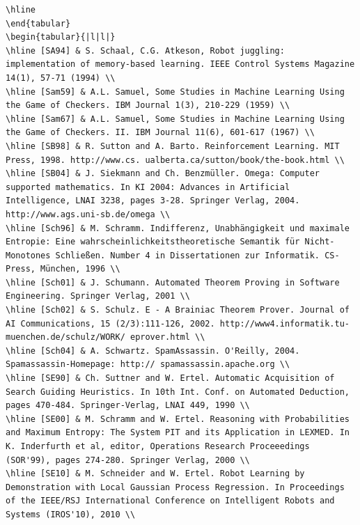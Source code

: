 \documentclass[10pt]{book}
\begin{document}
\begin{center}
\begin{enumerate}
\begin{center}
\begin{center}
\begin{center}
\begin{center}
\begin{center}
\begin{verbatim}
\hline
\end{tabular}
\begin{tabular}{|l|l|}
\hline [SA94] & S. Schaal, C.G. Atkeson, Robot juggling: implementation of memory-based learning. IEEE Control Systems Magazine 14(1), 57-71 (1994) \\
\hline [Sam59] & A.L. Samuel, Some Studies in Machine Learning Using the Game of Checkers. IBM Journal 1(3), 210-229 (1959) \\
\hline [Sam67] & A.L. Samuel, Some Studies in Machine Learning Using the Game of Checkers. II. IBM Journal 11(6), 601-617 (1967) \\
\hline [SB98] & R. Sutton and A. Barto. Reinforcement Learning. MIT Press, 1998. http://www.cs. ualberta.ca/sutton/book/the-book.html \\
\hline [SB04] & J. Siekmann and Ch. Benzmüller. Omega: Computer supported mathematics. In KI 2004: Advances in Artificial Intelligence, LNAI 3238, pages 3-28. Springer Verlag, 2004. http://www.ags.uni-sb.de/omega \\
\hline [Sch96] & M. Schramm. Indifferenz, Unabhängigkeit und maximale Entropie: Eine wahrscheinlichkeitstheoretische Semantik für Nicht-Monotones Schließen. Number 4 in Dissertationen zur Informatik. CS-Press, München, 1996 \\
\hline [Sch01] & J. Schumann. Automated Theorem Proving in Software Engineering. Springer Verlag, 2001 \\
\hline [Sch02] & S. Schulz. E - A Brainiac Theorem Prover. Journal of AI Communications, 15 (2/3):111-126, 2002. http://www4.informatik.tu-muenchen.de/schulz/WORK/ eprover.html \\
\hline [Sch04] & A. Schwartz. SpamAssassin. O'Reilly, 2004. Spamassassin-Homepage: http:// spamassassin.apache.org \\
\hline [SE90] & Ch. Suttner and W. Ertel. Automatic Acquisition of Search Guiding Heuristics. In 10th Int. Conf. on Automated Deduction, pages 470-484. Springer-Verlag, LNAI 449, 1990 \\
\hline [SE00] & M. Schramm and W. Ertel. Reasoning with Probabilities and Maximum Entropy: The System PIT and its Application in LEXMED. In K. Inderfurth et al, editor, Operations Research Proceeedings (SOR'99), pages 274-280. Springer Verlag, 2000 \\
\hline [SE10] & M. Schneider and W. Ertel. Robot Learning by Demonstration with Local Gaussian Process Regression. In Proceedings of the IEEE/RSJ International Conference on Intelligent Robots and Systems (IROS'10), 2010 \\

\end{verbatim}
\end{center}
\end{center}
\end{center}
\end{center}
\end{center}
\end{enumerate}
\end{center}
\end{document}
